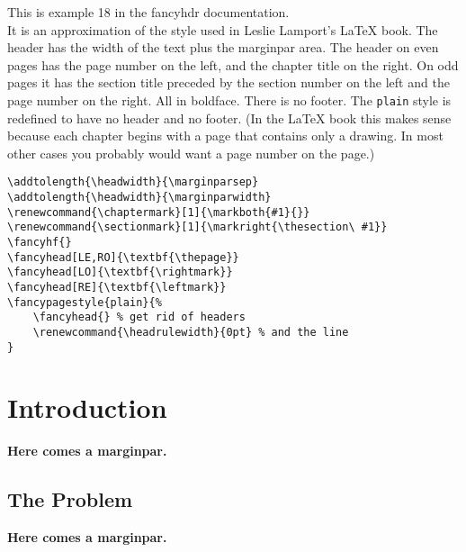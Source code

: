\documentclass[openany]{book}
\renewcommand{\chaptermark}[1]{\markboth{#1}{}}
\renewcommand{\sectionmark}[1]{\markright{\thesection\ #1}}
\renewcommand{\headrulewidth}{0pt} %
\begin{document}
\tableofcontents

\bigskip

\begin{boxedminipage}{\textwidth}
This is example 18 in the fancyhdr documentation.\\
It is an approximation of the style used in Leslie Lamport's \LaTeX{} book.
The header has the width of the text plus the marginpar area. The header on even pages has the page number on the left, and the chapter title on the right. On odd pages it has the section title preceded by the section number on the left and the page number on the right. All in boldface.
There is no footer. The \texttt{plain} style is redefined to have no header and no footer. (In the \LaTeX{} book this makes sense because each chapter begins with a page that contains only a drawing. In most other cases you probably would want a page number on the page.)
\begin{verbatim}
\addtolength{\headwidth}{\marginparsep}
\addtolength{\headwidth}{\marginparwidth}
\renewcommand{\chaptermark}[1]{\markboth{#1}{}}
\renewcommand{\sectionmark}[1]{\markright{\thesection\ #1}}
\fancyhf{}
\fancyhead[LE,RO]{\textbf{\thepage}}
\fancyhead[LO]{\textbf{\rightmark}}
\fancyhead[RE]{\textbf{\leftmark}}
\fancypagestyle{plain}{%
    \fancyhead{} % get rid of headers
    \renewcommand{\headrulewidth}{0pt} % and the line
}
\end{verbatim}
\end{boxedminipage}

\chapter{Introduction}

\textbf{Here comes a marginpar.}

\lipsum

\section{The Problem}
\label{sec:problem}

\textbf{Here comes a marginpar.}

\lipsum[1]
\end{document}
